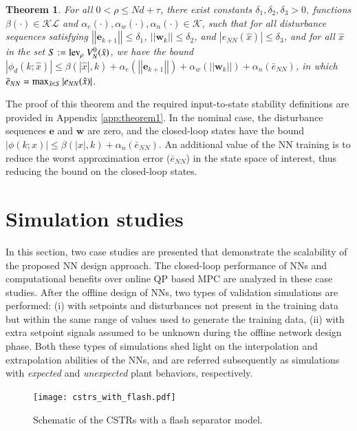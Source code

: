 \documentclass[preprint,5p, twocolumn, authoryear]{elsarticle}
\newcommand{\norm}[1]{\left| #1 \right|}
\newcommand{\xhat}{\hat{x}}
\newtheorem{thm}{Theorem}
\begin{document}
\begin{thm} \label{thm:nnrobustness} For all $ 0 < \rho \leq Nd + \tau$, there
exist constants $\delta_1, \delta_2, \delta_3 > 0$, functions $\beta(\cdot) \in
\mathcal{K} \mathcal{L}$ and $\alpha_e(\cdot) , \alpha_w(\cdot),
\alpha_{n}(\cdot) \in \mathcal{K}$, such that for all disturbance sequences
satisfying $\norm{\norm{\mathbf{e}_{k+1}}} \leq \delta_1$,
$\norm{\norm{\mathbf{w}_k}} \leq \delta_2$, and $\norm{e_{NN}(\xhat)} \leq
\delta_3$, and for all $\xhat$ in the set $S := \textnormal{lev}_{\rho} \
V_N^0(\xhat)$, we have the bound $\norm{\phi_d(k; \xhat)} \leq
\beta(\norm{\xhat}, k) + \alpha_e(\norm{\norm{\mathbf{e}_{k+1}}}) +
\alpha_w(\norm{\norm{\mathbf{w}_k}}) + \alpha_n(\bar{e}_{NN})$, in which
$\bar{e}_{NN} = \textnormal{max}_{\xhat \in S} \norm{e_{NN}(\xhat)}$.
\end{thm}

The proof of this theorem and the required input-to-state stability definitions
are provided in Appendix \ref{app:theorem1}. In the nominal case, the
disturbance sequences $\mathbf{e}$ and $\mathbf{w}$ are zero, and the
closed-loop states have the bound $\norm{\phi(k; x)} \leq \beta(\norm{x}, k) +
\alpha_n(\bar{e}_{NN})$. An additional value of the NN training is to reduce the
worst approximation error ($\bar{e}_{NN}$) in the state space of interest, thus
reducing the bound on the closed-loop states.

\section{Simulation studies} \label{sec:simulation_studies}

In this section, two case studies are presented that demonstrate the scalability
of the proposed NN design approach. The closed-loop performance of NNs and
computational benefits over online QP based MPC are analyzed in these case
studies. After the offline design of NNs, two types of validation simulations
are performed: (i) with setpoints and disturbances not present in the training
data but within the same range of values used to generate the training data,
(ii) with extra setpoint signals assumed to be unknown during the offline
network design phase. Both these types of simulations shed light on the
interpolation and extrapolation abilities of the NNs, and are referred
subsequently as simulations with \textit{expected} and \textit{unexpected} plant
behaviors, respectively. 

\begin{figure}[h]
    \centering
    \texttt{[image: cstrs\_with\_flash.pdf]}
    \caption{Schematic of the CSTRs with a flash separator model.}
    \label{fig:schematic_cstrs}
\end{figure}
\end{document}
